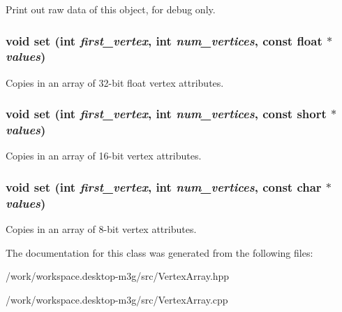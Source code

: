 Print out raw data of this object, for debug only. \hypertarget{classm3g_1_1VertexArray_24b9d666468f856b2bf09e450b20fdfb}{
\subsubsection[{set}]{\setlength{\rightskip}{0pt plus 5cm}void set (int {\em first\_\-vertex}, \/  int {\em num\_\-vertices}, \/  const float $\ast$ {\em values})}}
\label{classm3g_1_1VertexArray_24b9d666468f856b2bf09e450b20fdfb}


Copies in an array of 32-bit float vertex attributes. \hypertarget{classm3g_1_1VertexArray_f417744f1798d293c85c5e7fb6e1e846}{
\subsubsection[{set}]{\setlength{\rightskip}{0pt plus 5cm}void set (int {\em first\_\-vertex}, \/  int {\em num\_\-vertices}, \/  const short $\ast$ {\em values})}}
\label{classm3g_1_1VertexArray_f417744f1798d293c85c5e7fb6e1e846}


Copies in an array of 16-bit vertex attributes. \hypertarget{classm3g_1_1VertexArray_c92a86c7439c8e38c7e5b69e3eca3ee1}{
\subsubsection[{set}]{\setlength{\rightskip}{0pt plus 5cm}void set (int {\em first\_\-vertex}, \/  int {\em num\_\-vertices}, \/  const char $\ast$ {\em values})}}
\label{classm3g_1_1VertexArray_c92a86c7439c8e38c7e5b69e3eca3ee1}


Copies in an array of 8-bit vertex attributes. 

The documentation for this class was generated from the following files:\begin{CompactItemize}
\item 
/work/workspace.desktop-m3g/src/VertexArray.hpp\item 
/work/workspace.desktop-m3g/src/VertexArray.cpp\end{CompactItemize}
